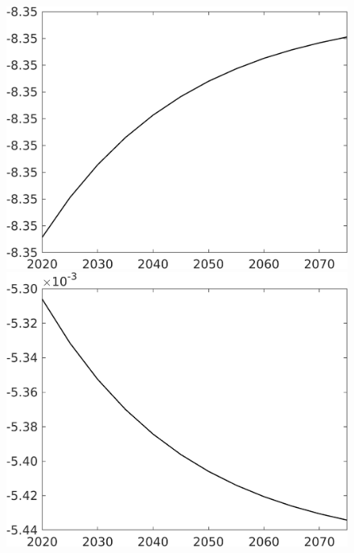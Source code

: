 \documentclass[12pt]{article}
\begin{document}
\begin{figure}[h!!]
\begin{minipage}[]{0.32\textwidth}
	\end{minipage}	
	\begin{minipage}[]{0.32\textwidth}
		\includegraphics[width=1\textwidth]{../../codding_model/own_basedOnFried/optimalPol_010922_revision/figures/all_13Sept22/CompTaul_Equlab_LFBAUPer_Reg0_N_spillover0_nsk0_xgr1_knspil1_sep1_countec0_GovRev0_etaa0.79.png}
	\end{minipage}	
\begin{minipage}[]{0.32\textwidth}
\includegraphics[width=1\textwidth]{../../codding_model/own_basedOnFried/optimalPol_010922_revision/figures/all_13Sept22/CompTaul_Equlab_LFBAUPer_Reg0_EY_spillover0_nsk0_xgr1_knspil1_sep1_countec0_GovRev0_etaa0.79.png}

\end{minipage}
\end{figure}
\end{document}
